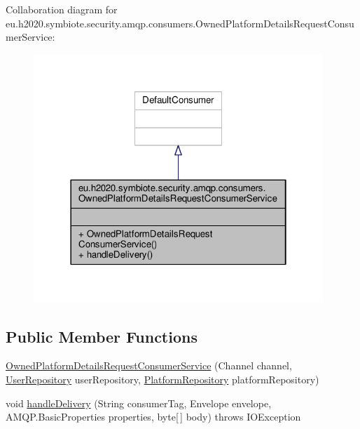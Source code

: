 Collaboration diagram for eu.\+h2020.\+symbiote.\+security.\+amqp.\+consumers.\+Owned\+Platform\+Details\+Request\+Consumer\+Service\+:
\nopagebreak
\begin{figure}[H]
\begin{center}
\leavevmode
\includegraphics[width=310pt]{classeu_1_1h2020_1_1symbiote_1_1security_1_1amqp_1_1consumers_1_1OwnedPlatformDetailsRequestConsumerService__coll__graph}
\end{center}
\end{figure}
\subsection*{Public Member Functions}
\begin{DoxyCompactItemize}
\item 
\hyperlink{classeu_1_1h2020_1_1symbiote_1_1security_1_1amqp_1_1consumers_1_1OwnedPlatformDetailsRequestConsumerService_a79b32cc135bcb5cdef4783308bdbeffa}{Owned\+Platform\+Details\+Request\+Consumer\+Service} (Channel channel, \hyperlink{interfaceeu_1_1h2020_1_1symbiote_1_1security_1_1repositories_1_1UserRepository}{User\+Repository} user\+Repository, \hyperlink{interfaceeu_1_1h2020_1_1symbiote_1_1security_1_1repositories_1_1PlatformRepository}{Platform\+Repository} platform\+Repository)
\item 
void \hyperlink{classeu_1_1h2020_1_1symbiote_1_1security_1_1amqp_1_1consumers_1_1OwnedPlatformDetailsRequestConsumerService_a910d4de7fd8d139915bd0769ef19262e}{handle\+Delivery} (String consumer\+Tag, Envelope envelope, A\+M\+Q\+P.\+Basic\+Properties properties, byte\mbox{[}$\,$\mbox{]} body)  throws I\+O\+Exception 
\end{DoxyCompactItemize}


